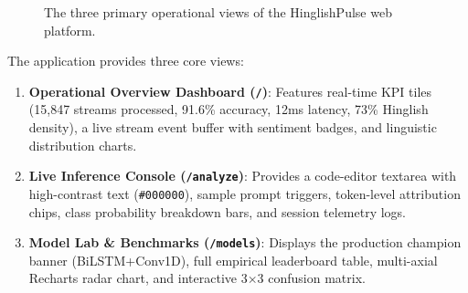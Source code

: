 \documentclass[11pt,a4paper]{article}
\begin{document}
\begin{figure}[h]
\centering
{}
\caption{The three primary operational views of the HinglishPulse web platform.}
\label{fig:frontend_views}
\end{figure}

The application provides three core views:
\begin{enumerate}
    \item \textbf{Operational Overview Dashboard (\texttt{/})}: Features real-time KPI tiles (15,847 streams processed, 91.6\% accuracy, 12ms latency, 73\% Hinglish density), a live stream event buffer with sentiment badges, and linguistic distribution charts.
    \item \textbf{Live Inference Console (\texttt{/analyze})}: Provides a code-editor textarea with high-contrast text (\texttt{\#000000}), sample prompt triggers, token-level attribution chips, class probability breakdown bars, and session telemetry logs.
    \item \textbf{Model Lab \& Benchmarks (\texttt{/models})}: Displays the production champion banner (BiLSTM+Conv1D), full empirical leaderboard table, multi-axial Recharts radar chart, and interactive 3$\times$3 confusion matrix.
\end{enumerate}
\end{document}
